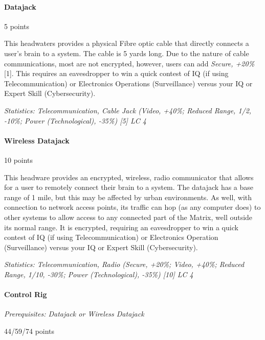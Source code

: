 \begin{multicols*}{3}
	\paragraph{Datajack}
	\begin{flushright}
		5 points
	\end{flushright}
	
	This headwaters provides a physical Fibre optic cable that directly connects a user's brain to a system. The cable is 5 yards long. Due to the nature of cable communications, most are not encrypted, however, users can add \textit{Secure, +20\%} [1]. This requires an eavesdropper to win a quick contest of IQ (if using Telecommunication) or Electronics Operations (Surveillance) versus your IQ or Expert Skill (Cybersecurity).
	
	\textit{\textcolor{OliveGreen}{Statistics: Telecommunication, Cable Jack (Video, +40\%; Reduced Range, 1/2, -10\%; Power (Technological), -35\%) [5] LC 4}}
	
	\paragraph{Wireless Datajack}
	\begin{flushright}
		10 points
	\end{flushright}
	
	This headware provides an encrypted, wireless, radio communicator that allows for a user to remotely connect their brain to a system. The datajack has a base range of 1 mile, but this may be affected by urban environments. As well, with connection to network access points, its traffic can hop (as any computer does) to other systems to allow access to any connected part of the Matrix, well outside its normal range. It is encrypted, requiring an eavesdropper to win a quick contest of IQ (if using Telecommunication) or Electronics Operation (Surveillance) versus your IQ or Expert Skill (Cybersecurity).
	
	\textit{\textcolor{OliveGreen}{Statistics: Telecommunication, Radio (Secure, +20\%; Video, +40\%; Reduced Range, 1/10, -30\%; Power (Technological), -35\%) [10] LC 4}}
	
	\paragraph{Control Rig}\label{control_rig}
	\textit{Prerequisites: Datajack or Wireless Datajack}
	\begin{flushright}
		44/59/74 points
	\end{flushright}
	

\end{multicols*}
